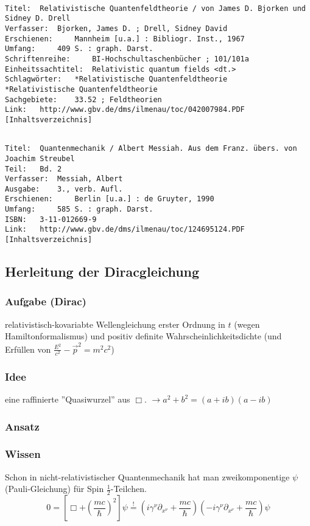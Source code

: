 \documentclass[twoside,a4paper]{scrartcl}
\renewcommand{\1}{\mathds{1}}
\newcommand{\ra}{\rightarrow}
\begin{document}
\begin{tiny}
\begin{verbatim}

Titel: 	Relativistische Quantenfeldtheorie / von James D. Bjorken und Sidney D. Drell
Verfasser: 	Bjorken, James D. ; Drell, Sidney David
Erschienen: 	Mannheim [u.a.] : Bibliogr. Inst., 1967
Umfang: 	409 S. : graph. Darst.
Schriftenreihe: 	BI-Hochschultaschenbücher ; 101/101a
Einheitssachtitel: 	Relativistic quantum fields <dt.>
Schlagwörter: 	*Relativistische Quantenfeldtheorie
*Relativistische Quantenfeldtheorie
Sachgebiete: 	33.52 ; Feldtheorien
Link: 	http://www.gbv.de/dms/ilmenau/toc/042007984.PDF [Inhaltsverzeichnis]
\end{verbatim}
\end{tiny}


\begin{tiny}
\begin{verbatim}

Titel: 	Quantenmechanik / Albert Messiah. Aus dem Franz. übers. von Joachim Streubel
Teil: 	Bd. 2
Verfasser: 	Messiah, Albert
Ausgabe: 	3., verb. Aufl.
Erschienen: 	Berlin [u.a.] : de Gruyter, 1990
Umfang: 	585 S. : graph. Darst.
ISBN: 	3-11-012669-9
Link: 	http://www.gbv.de/dms/ilmenau/toc/124695124.PDF [Inhaltsverzeichnis]
\end{verbatim}
\end{tiny}


\subsection{Herleitung der Diracgleichung}
\subsubsection*{Aufgabe (Dirac)}
relativistisch-kovariabte Wellengleichung erster Ordnung in $t$ (wegen Hamiltonformalismus) und positiv definite Wahrscheinlichkeitsdichte (und Erfüllen von $\frac{E^2}{c^2}-\vec p^2=m^2c^2$)
\subsubsection*{Idee}
eine raffinierte ''Quasiwurzel'' aus $\Box$. $\ra a^2+b^2=(a+ib)(a-ib)$
\subsubsection*{Ansatz}
\subsubsection*{Wissen}
Schon in nicht-relativistischer Quantenmechanik hat man zweikomponentige $\psi$ (Pauli-Gleichung) für Spin $\frac{1}{2}$-Teilchen.
$$0=[\Box+(\frac{mc}{\hbar})^2]\psi\stackrel{!}{=} (i\gamma^\nu\partial_{x^\nu}+\frac{mc}{\hbar})(-i\gamma^\nu\partial_{x^\nu}+\frac{mc}{\hbar})\psi$$
\end{document}
